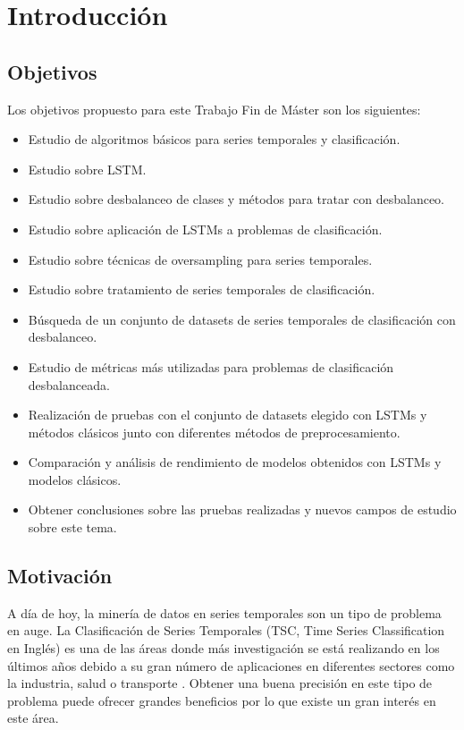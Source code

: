\chapter{Introducción}
\section{Objetivos}
Los objetivos propuesto para este Trabajo Fin de Máster son los siguientes:
\begin{itemize}
	\item Estudio de algoritmos básicos para series temporales y clasificación.
	\item Estudio sobre LSTM.
	\item Estudio sobre desbalanceo de clases y métodos para tratar con desbalanceo.
	\item Estudio sobre aplicación de LSTMs a problemas de clasificación.
	\item Estudio sobre técnicas de oversampling para series temporales.
	\item Estudio sobre tratamiento de series temporales de clasificación.
	\item Búsqueda de un conjunto de datasets de series temporales de clasificación con desbalanceo.
	\item Estudio de métricas más utilizadas para problemas de clasificación desbalanceada.
	\item Realización de pruebas con el conjunto de datasets elegido con LSTMs y métodos clásicos junto con diferentes métodos de preprocesamiento.
	\item Comparación y análisis de rendimiento de modelos obtenidos con LSTMs y modelos clásicos.
	\item Obtener conclusiones sobre las pruebas realizadas y nuevos campos de estudio sobre este tema.
\end{itemize}
\newpage
\section{Motivación}
A día de hoy, la minería de datos en series temporales son un tipo de problema en auge. La Clasificación de Series Temporales (TSC, Time Series Classification en Inglés) es una de las áreas donde más investigación se está realizando en los últimos años debido a su gran número de aplicaciones en diferentes sectores como la industria, salud o transporte \cite{cao2013integrated} \cite{cao2014parsimonious} \cite{he2017uncertainty} \cite{xu2018spatio} \cite{roychoudhury2017cost} \cite{liang2013effective} \cite{geng2018cost} . Obtener una buena precisión en este tipo de problema puede ofrecer grandes beneficios por lo que existe un gran interés en este área.\newline

